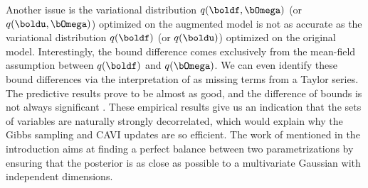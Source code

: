 Another issue is the variational distribution $q(\boldf, \bOmega)$ (or $q(\boldu, \bOmega)$) optimized on the augmented model is not as accurate as the variational distribution $q(\boldf)$ (or $q(\boldu)$) optimized on the original model.
Interestingly, the bound difference comes exclusively from the mean-field assumption between $q(\boldf)$ and $q(\bOmega)$.
We can even identify these bound differences via the interpretation of \citet{jaakkolaVariationalApproachBayesian1997} as missing terms from a Taylor series.
The predictive results  prove to be almost as good, and the difference of bounds is not always significant .
These empirical results give us an indication that the sets of variables are naturally strongly decorrelated, which would explain why the Gibbs sampling and \ac{CAVI} updates are so efficient.
The work of \citet{gorinovaAutomaticReparameterisationProbabilistic2020} mentioned in the introduction aims at finding a perfect balance between two parametrizations by ensuring that the posterior is as close as possible to a multivariate Gaussian with independent dimensions. 





